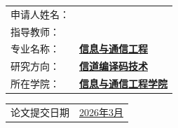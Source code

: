 \vspace{50pt}

\begin{center}
     \songti
    \begin{tabularx}{.6\textwidth}{>{\songti}l >{\songti}X<{\centering}}
        申请人姓名： & \bfseries \uline{\hfill  \hfill}        \\
        指导教师：   & \bfseries \uline{\hfill  \hfill} \hfill \\
        专业名称：   & \bfseries \uline{\hfill 信息与通信工程 \hfill}                \\
        研究方向：   & \bfseries \uline{\hfill 信道编译码技术 \hfill}              \\
        所在学院：   & \bfseries \uline{\hfill 信息与通信工程学院 \hfill}          \\
    \end{tabularx}
\end{center}

\vspace{40pt}

\begin{center}
     \bfseries
    \begin{tabularx}{.5\textwidth}{>{\songti}l >{\songti}X<{\centering}}
        论文提交日期 & \uline{\hfill 2026年3月 \hfill}
    \end{tabularx}
\end{center}

\restoregeometry
